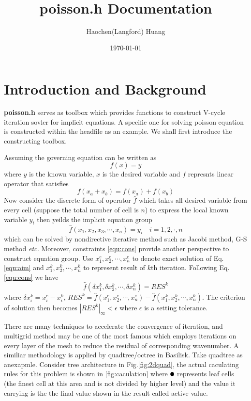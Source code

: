 \documentclass[a4paper]{article}
\title{poisson.h Documentation}
\author{Haochen(Langford) Huang}
\date{\today}
\newcommand{\activetest}{\tikz \fill[black] (3pt,3pt) circle (3pt);}
\begin{document}
\maketitle

\section{Introduction and Background}\label{sec:intro}
\textbf{poisson.h} serves as toolbox which provides functions to construct V-cycle iteration sovler for implicit equations. A specific one for solving poisson equation is constructed within the headfile as an example. We shall first introduce the constructing toolbox.\par
Assuming the governing equation can be written as
\begin{equation}
  f( x) = y
\end{equation}
where $y$ is the known variable, $ x$ is the desired variable and $f$ represnts linear operator that satisfies
\begin{equation}\label{equ:cons}
  f( x_a+ x_b) = f( x_a) + f( x_b)
\end{equation}
Now consider the discrete form of operator $\hat{f}$ which takes all desired variable from every cell (suppose the total number of cell is $n$) to express the local known variable $y_i$ then yeilds the implicit equation group
\begin{equation}\label{equ:aim}
  \hat{f}(x_1,x_2,x_3,\cdots,x_n) = y_i \quad i = 1,2,\cdot,n
\end{equation}
which can be solved by nondirective iterative method such as Jacobi method, G-S method\cite{moin2010fundamentals} \emph{etc.} Moreover, constraints \ref{equ:cons} provide another perspective to construct equation group. Use $x_1^e,x_2^e,\cdots,x_n^e$ to denote exact solution of Eq.\ref{equ:aim} and $x_1^k,x_2^k,\cdots,x_n^k$ to represent result of $k$th iteration. Following Eq.\ref{equ:cons} we have
\begin{equation}\label{equ:iter}
  \hat{f}(\delta x_1^k,\delta x_2^k,\cdots, \delta x_n^k) = RES^k
\end{equation}
where $\delta x_i^k = x_i^e - x_i^k$, $RES^k = \hat{f}(x_1^e,x_2^e,\cdots,x_n^e) - \hat{f}(x_1^k,x_2^k,\cdots,x_n^k)$. The criterion of solution then becomes $|RES^k|_{\infty}<\epsilon$ where $\epsilon$ is a setting tolerance.\par
There are many techniques to accelerate the convergence of iteration, and multigrid method\cite{wesseling1995introduction} may be one of the most famous which employs iterations on every layer of the mesh to reduce the residual of corresponding wavenumber. A similiar methodology is applied by quadtree/octree in Basilisk. Take quadtree as anexapmle. Consider tree architecture in Fig.\ref{fig:2dquad}, the actual caculating rules for this problem is shown in \ref{fig:caculation} where $\activetest$ represents leaf cells (the finest cell at this area and is not divided by higher level) and the value it carrying is the the final value shown in the result called active value.
\end{document}

